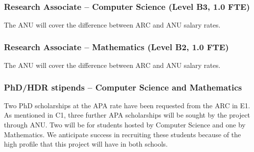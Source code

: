 \documentclass[a4paper,twoside,12pt,compact]{article}
\begin{document}
%
%




\subsubsection*{Research Associate – Computer Science (Level B3, 1.0 FTE)}

The ANU will cover the difference between ARC and ANU salary rates.


\subsubsection*{Research Associate – Mathematics (Level B2, 1.0 FTE)}

The ANU will cover the difference between ARC and ANU salary rates.

\subsubsection*{PhD/HDR stipends – Computer Science and Mathematics}

Two PhD scholarships at the APA rate have been requested from the ARC in E1.
As mentioned in C1, three further APA scholarships will be 
sought by the project through ANU. Two will be for students
hosted by Computer Science and one by Mathematics. We anticipate success in recruiting these students 
because of the high profile that this project will have in both schools. 


\end{document}
